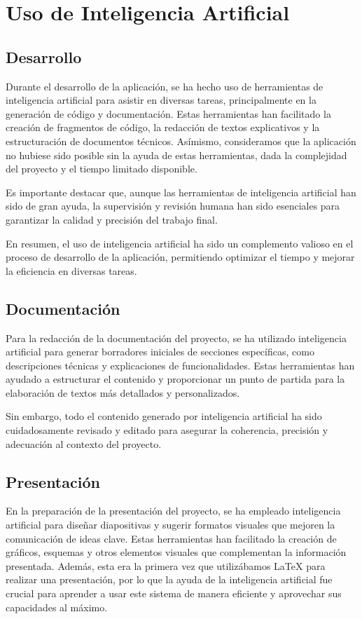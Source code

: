 \section{Uso de Inteligencia Artificial}
\subsection{Desarrollo}
Durante el desarrollo de la aplicación, se ha hecho uso de herramientas de inteligencia artificial para asistir en 
diversas tareas, principalmente en la generación de código y documentación. 
Estas herramientas han facilitado la creación de fragmentos de código, la redacción de textos explicativos
 y la estructuración de documentos técnicos. Asímismo, consideramos que la aplicación no hubiese sido posible  
sin la ayuda de estas herramientas, dada la complejidad del proyecto y el tiempo limitado disponible.

Es importante destacar que, aunque las herramientas de inteligencia artificial han sido de gran ayuda,
 la supervisión y revisión humana han sido esenciales para garantizar la calidad y precisión del trabajo final.

En resumen, el uso de inteligencia artificial ha sido un complemento valioso en el proceso de desarrollo
 de la aplicación, permitiendo optimizar el tiempo y mejorar la eficiencia en diversas tareas.
\subsection{Documentación}
Para la redacción de la documentación del proyecto, se ha utilizado inteligencia artificial para generar
borradores iniciales de secciones específicas, como descripciones técnicas y explicaciones de funcionalidades.
Estas herramientas han ayudado a estructurar el contenido y proporcionar un punto de partida para la elaboración
de textos más detallados y personalizados.

Sin embargo, todo el contenido generado por inteligencia artificial ha sido cuidadosamente revisado y editado
para asegurar la coherencia, precisión y adecuación al contexto del proyecto.
\subsection{Presentación}
En la preparación de la presentación del proyecto, se ha empleado inteligencia artificial para diseñar
 diapositivas y sugerir formatos visuales que mejoren la comunicación de ideas clave. 
 Estas herramientas han facilitado la creación de gráficos, esquemas y otros elementos visuales que complementan
 la información presentada. Además, esta era la primera vez que utilizábamos LaTeX para realizar una presentación,
 por lo que la ayuda de la inteligencia artificial fue crucial para aprender a usar este sistema de manera
 eficiente y aprovechar sus capacidades al máximo.